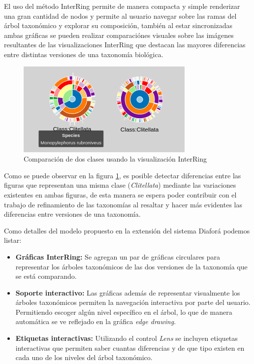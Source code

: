 \documentclass[journal]{IEEEtran}
\begin{document}
El uso del método InterRing permite de manera compacta y simple renderizar una gran cantidad de nodos y permite al usuario navegar sobre las ramas 
del árbol taxonómico y explorar su composición, también al estar sincronizadas ambas gráficas se pueden realizar comparaciónes 
visuales sobre las imágenes resultantes de las visualizaciones InterRing que destacan las mayores diferencias entre distintas versiones de una taxonomía biológica.

\begin{figure}
  \centering
  \includegraphics[]{interringCompare.png}
  \caption{Comparación de dos clases usando la visualización InterRing}
  \label{class_compare}
\end{figure}

Como se puede observar en la figura \ref{class_compare}, es posible detectar diferencias entre las figuras que representan una misma clase (\emph{Clitellata})
mediante las variaciones existentes en ambas figuras, de esta manera se espera poder contribuir con el trabajo de refinamiento de las taxonomías al 
resaltar y hacer más evidentes las diferencias entre versiones de una taxonomía.

Como detalles del modelo propuesto en la extensión del sistema Diaforá podemos listar:

\begin{itemize}
  \item \textbf{Gráficas InterRing:} Se agregan un par de gráficas circulares para representar los árboles taxonómicos de las
  dos versiones de la taxonomía que se está comparando.
  \item  \textbf{Soporte interactivo:} Las gráficas además de representar visualmente los árboles taxonómicos permiten la navegación interactiva
  por parte del usuario. Permitiendo escoger algún nivel específico en el árbol, lo que de manera automática se ve reflejado en la gráfica \emph{edge drawing}.
  \item \textbf{Etiquetas interactivas:} Utilizando el control \emph{Lens} se incluyen etiquetas interactivas que permiten saber cuantas diferencias y de que tipo existen
  en cada uno de los niveles del árbol taxonómico.
\end{itemize}
\end{document}
